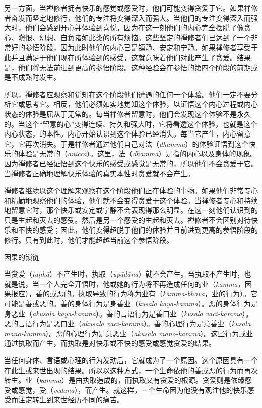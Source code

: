 另一方面，当禅修者拥有快乐的感觉或感受时，他们可能变得贪爱于它。如果禅修者奋发而坚定地修行，他们的专注将变得深入而强大。当他们的专注变得深入而强大时，他们会感到开心并体验到喜悦，因为在这一刻他们的内心完全摆脱了像贪心、瞋恨、幻想、自负诸如此类的所有烦恼。这些坚定的禅修者们已达到了一个非常好的参悟阶段，因为此时他们的内心已是镇静、安定和宁静。如果禅修者享受于此并且满足于他们现在所体验到的感受，这就意味着他们对此产生了贪爱。结果是，他们将无法前进到更高的参悟阶段。这种经验会在参悟的第四个阶段的前期或是不成熟时发生。

所以，禅修者应观察和觉知在这个阶段他们遭遇的任何一个体验。他们一定不要分析它或思考它。相反，他们\1必须如实地觉知这个体验，以证悟这个内心过程或内心状态的体验是屈从于无常的。每当禅修者留意时，他们会发现这个体验不是永久的。当这个“留意的心”变得连续、持久和强大时，它将看透这个体验，也就是这个内心状态，的本性。内心开始认识到这个体验已经消失。每当它产生，内心留意它，它再次消失。于是禅修者通过他们自己对法（{\it dhamma}）的体验证悟到这个快乐的体验是无常的（{\it anicca}）。这里，法（{\it dhamma}）是指的内心以及身体的现象。因为禅修者已经证悟到这个快乐的感受或感觉是无常的，所以他们不会贪爱于它。当禅修者正确地理解快乐体验的真实本性时贪爱就不会产生。

禅修者继续以这个理解来观察在这个阶段他们正在体验的事物。如果他们非常专心和精勤地观察他们的体验，他们就不会变得贪爱于这个体验。当禅修者专心和持续地留意它时，那个快乐或安定或宁静不会表现得那么明显。在这一刻他们认识到的只是生起和灭去的感受。然后是另一个感受的生起和灭去。禅修者不会区别对待快乐和不快的感受；因此，他们变得超脱于他们的体验并且前进到更高的参悟阶段的修行。只有到此时，他们才能超越当前这个参悟阶段。

\sssubsectnonb \1因果的锁链

当贪爱（{\it ta\d nh\=a}）不产生时，执取（{\it up\=ad\=ana}）就不会产生。当执取不产生时，也就是说，当一个人完全开悟时，他或她的行为将不再造成任何的业（{\it kamma}，因果报应），善的或恶的。执取导致的行为称为业有（{\it kamma-bhava}，业的行为）。它可能是善或恶的。善的身体行为是身善业（{\it kusala kaya-kamma}）。恶的身体行为是身恶业（{\it akusala kaya-kamma}）。善的言语行为是善口业（{\it kusala vaci-kamma}）。恶的言语行为是恶口业（{\it akusala vaci-kamma}）。善的心理行为是意善业（{\it kusala mano-kamma}）。恶的心理行为是意恶业（{\it akusala mano-kamma}）。这些行为或业通过执取而产生，而执取是对快乐或不快的感受或感觉贪爱的结果。

当任何身体、言语或心理的行为发动后，它就成为了一个原因。这个原因具有一个在此生或来世出现的结果。所以以这种方式，一个生命依他的善或恶的行为而再次转生。业（{\it kamma}）是由执取造成的，而执取又有贪爱的根源。贪爱则是依缘感受或感觉，受（{\it vedana}），而产生。就这样，一个生命因为他没有观注他的快乐感受而注定转生到来世经历不同的痛苦。

